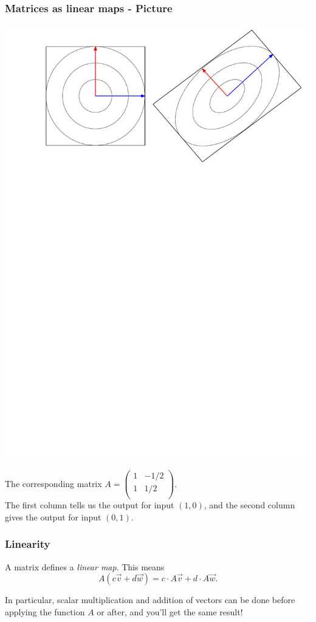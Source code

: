 \documentclass[12pt]{beamer}
\theoremstyle{definition}
\begin{document}
\begin{frame}
\frametitle{Matrices as linear maps - Picture}
\centerline{\includegraphics[width=.8\textwidth]{matr-pic.pdf}}

The corresponding matrix $A = \left( \begin{array}{cc} 1 & - 1/2  \\1 & 1/2 \\ \end{array} \right)$.\\
The first column tells us the output for input $(1,0)$,
and the second column gives the output for input $(0,1)$.
\end{frame}


\begin{frame}
\frametitle{Linearity}

A matrix defines a {\em linear map}. This means 
\[ A(c \vec{v} + d \vec{w}) = c \cdot A \vec{v} + d \cdot A \vec{w}.\]

In particular, scalar multiplication and addition of vectors
can be done before applying the function $A$ or after, and you'll
get the same result!
\end{frame}
\end{document}
